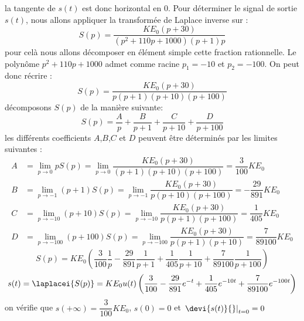 la tangente de $s(t)$ est donc horizontal en 0.
Pour déterminer le signal de sortie $s(t)$, nous allons appliquer la
transformée de Laplace inverse sur :
\[
S(p) = \dfrac{KE_0(p+30)}{(p^2+110p+1000)(p+1)p}
\]
pour celà nous allons décomposer en élément simple cette fraction rationnelle.
Le polynôme $p^2+110p+1000$ admet comme racine $p_1=-10$ et $p_2=-100$.
On peut donc récrire :
\[
S(p)=\dfrac{KE_0(p+30)}{p(p+1)(p+10)(p+100)}
\]
décomposons $S(p)$ de la manière suivante:
\[
S(p)=\dfrac{A}{p}+\dfrac{B}{p+1}+\dfrac{C}{p+10}+\dfrac{D}{p+100}
\]
les différents coefficients $A$,$B$,$C$ et $D$ peuvent être déterminés par
les limites suivantes :
\begin{align*}
    A&=\lim\limits_{p \rightarrow 0} p S(p) =
    \lim\limits_{p \rightarrow 0}
    \dfrac{KE_0(p+30)}{(p+1)(p+10)(p+100)} =
    \dfrac{3}{100}KE_0 \\
    B&=\lim\limits_{p \rightarrow -1} (p+1) S(p) =
    \lim\limits_{p \rightarrow -1}
    \dfrac{KE_0(p+30)}{p(p+10)(p+100)}=
    -\dfrac{29}{891}KE_0\\
    C&=\lim\limits_{p \rightarrow -10} (p+10) S(p) =
    \lim\limits_{p \rightarrow -10}
    \dfrac{KE_0(p+30)}{p(p+1)(p+100)}=
    \dfrac{1}{405}KE_0 \\
    D&=\lim\limits_{p \rightarrow -100} (p+100) S(p) =
    \lim\limits_{p \rightarrow -100}
    \dfrac{KE_0(p+30)}{p(p+1)(p+10)}=
    \dfrac{7}{89100}KE_0
\end{align*}
\[
S(p) = KE_0\left(\dfrac{3}{100}  \dfrac{1}{p} -\dfrac{29}{891}\dfrac{1}{p+1} +
                                 \dfrac{1}{405}\dfrac{1}{p+10} +
                                 \dfrac{7}{89100}\dfrac{1}{p+100} \right)
\]
\[
s(t) = \laplacei{S(p)} = KE_0u(t)\left(\dfrac{3}{100} -
                         \dfrac{29}{891}e^{-t}+\dfrac{1}{405}e^{-10t}+
                         \dfrac{7}{89100}e^{-100t} \right)
\]
on vérifie que $s(+\infty)=\dfrac{3}{100}KE_0$, $s(0)=0$ et
$\left.\devi{s(t)}{}\right|_{t=0}=0$
